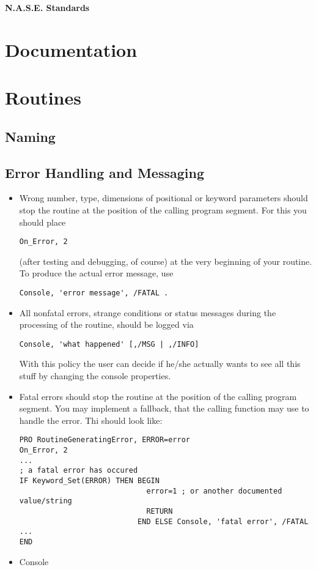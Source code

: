 \documentclass[12pt]{article}
\begin{document}
{\Huge\textbf{N.A.S.E. Standards}}

\section{Documentation}

\section{Routines}
\subsection{Naming}
\subsection{Error Handling and Messaging}
\begin{itemize}
%
\item Wrong number, type, dimensions of positional or keyword parameters should stop the routine at the position of the calling program segment. For this you should place 
\begin{verbatim}
On_Error, 2
\end{verbatim}
(after testing and debugging, of course) at the very beginning of your routine. To produce the actual error message, use
\begin{verbatim}
Console, 'error message', /FATAL .
\end{verbatim}
%
\item All nonfatal errors, strange conditions or status messages during the processing of the routine, should be logged via
\begin{verbatim}
Console, 'what happened' [,/MSG | ,/INFO] 
\end{verbatim}
With this policy the user can decide if he/she actually wants to see all this stuff by changing the console properties.
%
\item Fatal errors should stop the routine at the position of the calling program segment. You may implement a fallback, that the calling function may use to handle the error. Thi should look like:
\begin{verbatim}
PRO RoutineGeneratingError, ERROR=error
On_Error, 2
...
; a fatal error has occured
IF Keyword_Set(ERROR) THEN BEGIN
                             error=1 ; or another documented value/string
                             RETURN
                           END ELSE Console, 'fatal error', /FATAL
...
END
\end{verbatim}
%
\item Console
%
\end{itemize}
\end{document}

